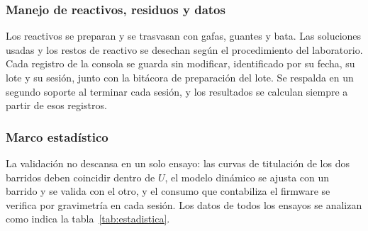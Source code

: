 \subsubsection{Manejo de reactivos, residuos y datos}\label{sec:manejo}
Los reactivos se preparan y se trasvasan con gafas, guantes y bata. Las soluciones usadas y los restos de reactivo se desechan según el procedimiento del laboratorio. Cada registro de la consola se guarda sin modificar, identificado por su fecha, su lote y su sesión, junto con la bitácora de preparación del lote. Se respalda en un segundo soporte al terminar cada sesión, y los resultados se calculan siempre a partir de esos registros.

\subsubsection{Marco estadístico}\label{sec:estadistica}
La validación no descansa en un solo ensayo: las curvas de titulación de los dos barridos deben coincidir dentro de $U$, el modelo dinámico se ajusta con un barrido y se valida con el otro, y el consumo que contabiliza el firmware se verifica por gravimetría en cada sesión. Los datos de todos los ensayos se analizan como indica la tabla~\ref{tab:estadistica}.

